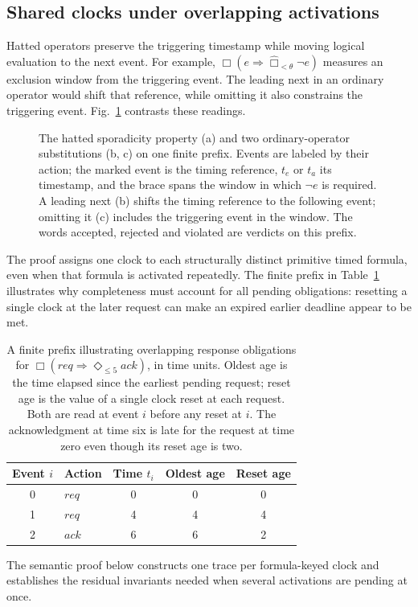 \documentclass{ieeeaccess}
\begin{document}
\subsection{Shared clocks under overlapping activations}
\label{subsec:overlap-motivation}
Hatted operators preserve the triggering timestamp while moving logical
evaluation to the next event. For example,
$\Box(e\Rightarrow\widehat{\Box}_{<\theta}\neg e)$ measures an exclusion
window from the triggering event. The leading next in an ordinary operator
would shift that reference, while omitting it also constrains the triggering
event. Fig.~\ref{fig:hat-reference} contrasts these readings.
\begin{figure}[t]
\centering

\caption{The hatted sporadicity property (a) and two ordinary-operator
substitutions (b, c) on one finite prefix. Events are labeled by their action;
the marked event is the timing reference, $t_e$ or $t_a$ its timestamp, and the
brace spans the window in which $\neg e$ is required. A leading next (b) shifts
the timing reference to the following event; omitting it (c) includes the
triggering event in the window. The words accepted, rejected and violated are
verdicts on this prefix.}
\label{fig:hat-reference}
\end{figure}

The proof assigns one clock to each structurally distinct primitive timed
formula, even when that formula is activated repeatedly. The finite prefix in
Table~\ref{tab:overlap-example} illustrates why completeness must account for
all pending obligations: resetting a single clock at the later request can
make an expired earlier deadline appear to be met.
\begin{table}[t]
\centering
\caption{A finite prefix illustrating overlapping response obligations for
$\Box(\mathit{req}\Rightarrow\Diamond_{\le5}\mathit{ack})$, in time units.
Oldest age is the time elapsed since the earliest pending request; reset age
is the value of a single clock reset at each request. Both are read at event
$i$ before any reset at $i$. The acknowledgment at time six is late for the
request at time zero even though its reset age is two.}
\label{tab:overlap-example}
\begin{tabular}{@{}clccc@{}}
\toprule
Event $i$ & Action & Time $t_i$ & Oldest age & Reset age\\
\midrule
0 & $\mathit{req}$ & 0 & 0 & 0\\
1 & $\mathit{req}$ & 4 & 4 & 4\\
2 & $\mathit{ack}$ & 6 & 6 & 2\\
\bottomrule
\end{tabular}
\end{table}
The semantic proof below constructs one trace per
formula-keyed clock and establishes the residual invariants needed when
several activations are pending at once.
\end{document}
